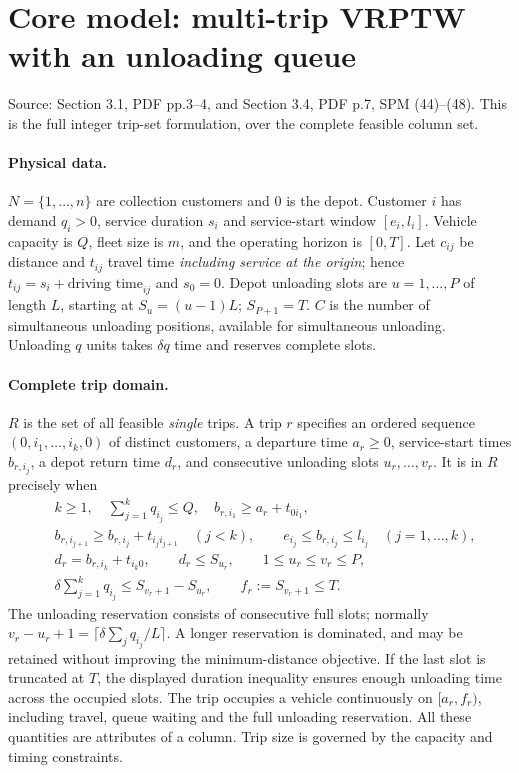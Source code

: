 \documentclass[11pt]{article}
\begin{document}
\section*{Core model: multi-trip VRPTW with an unloading queue}
Source: Section 3.1, PDF pp.3--4, and Section 3.4, PDF p.7,
SPM (44)--(48). This is the full integer trip-set formulation,
over the complete feasible column set.
\paragraph{Physical data.}
$N=\{1,\ldots,n\}$ are collection customers and $0$ is the depot.
Customer $i$ has demand $q_i>0$, service duration $s_i$ and service-start
window $[e_i,l_i]$. Vehicle capacity is $Q$, fleet size is $m$,
and the operating horizon is $[0,T]$. Let $c_{ij}$ be distance and
$t_{ij}$ travel time \emph{including service at the origin}; hence
$t_{ij}=s_i+\text{driving time}_{ij}$ and $s_0=0$.
Depot unloading slots are $u=1,\ldots,P$ of length $L$, starting at
$S_u=(u-1)L$; $S_{P+1}=T$. $C$ is the number of simultaneous unloading
positions, available for simultaneous unloading. Unloading $q$ units
takes $\delta q$ time and reserves complete slots.
\paragraph{Complete trip domain.}
$R$ is the set of all feasible \emph{single} trips. A trip $r$ specifies
an ordered sequence $(0,i_1,\ldots,i_k,0)$ of distinct customers,
a departure time $a_r\ge0$, service-start times $b_{r,i_j}$, a depot
return time $d_r$, and consecutive unloading slots $u_r,\ldots,v_r$.
It is in $R$ precisely when
\begin{align*}
&k\ge1,\quad \sum_{j=1}^kq_{i_j}\le Q,\quad
 b_{r,i_1}\ge a_r+t_{0i_1},\\
&b_{r,i_{j+1}}\ge b_{r,i_j}+t_{i_ji_{j+1}}\quad(j<k),\qquad
 e_{i_j}\le b_{r,i_j}\le l_{i_j}\quad(j=1,\ldots,k),\\
&d_r=b_{r,i_k}+t_{i_k0},\qquad d_r\le S_{u_r},\qquad
 1\le u_r\le v_r\le P,\\
&\delta\sum_{j=1}^kq_{i_j}\le S_{v_r+1}-S_{u_r},\qquad
 f_r:=S_{v_r+1}\le T.
\end{align*}
The unloading reservation consists of consecutive full slots; normally
$v_r-u_r+1=\lceil\delta\sum_jq_{i_j}/L\rceil$. A longer reservation
is dominated, and may be retained without improving the minimum-distance
objective. If the last slot is truncated at $T$, the displayed duration
inequality ensures enough unloading time across the occupied slots. The trip occupies a vehicle continuously on $[a_r,f_r)$,
including travel, queue waiting and the full unloading reservation.
All these quantities are attributes of a column. Trip size is governed by the capacity and timing constraints.
\end{document}
